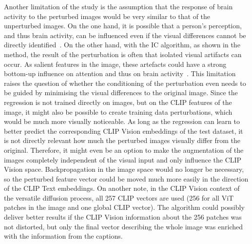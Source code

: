 Another limitation of the study is the assumption that the response of brain activity to the perturbed images would be very similar to that of the unperturbed images. On the one hand, it is possible that a person's perception, and thus brain activity, can be influenced even if the visual differences cannot be directly identified~\cite{rensinkVisualSensingSeeing2004}. On the other hand, with the IC algorithm, as shown in the method, the result of the perturbation is often that isolated visual artifacts can occur. As salient features in the image, these artefacts could have a strong bottom-up influence on attention and thus on brain activity~\cite{wolfeFiveFactorsThat2017}. This limitation raises the question of whether the conditioning of the perturbation even needs to be guided by minimising the visual differences to the original image. Since the regression is not trained directly on images, but on the CLIP features of the image, it might also be possible to create training data perturbations, which would be much more visually noticeable. As long as the regression can learn to better predict the corresponding CLIP Vision embeddings of the test dataset, it is not directly relevant how much the perturbed images visually differ from the original. Therefore, it might even be an option to make the augmentation of the images completely independent of the visual input and only influence the CLIP Vision space. Backpropagation in the image space would no longer be necessary, so the perturbed feature vector could be moved much more easily in the direction of the CLIP Text embeddings. On another note, in the CLIP Vision context of the versatile diffusion process, all 257 CLIP vectors are used (256 for all ViT patches in the image and one global CLIP vector). The algorithm could possibly deliver better results if the CLIP Vision information about the 256 patches was not distorted, but only the final vector describing the whole image was enriched with the information from the captions. 



